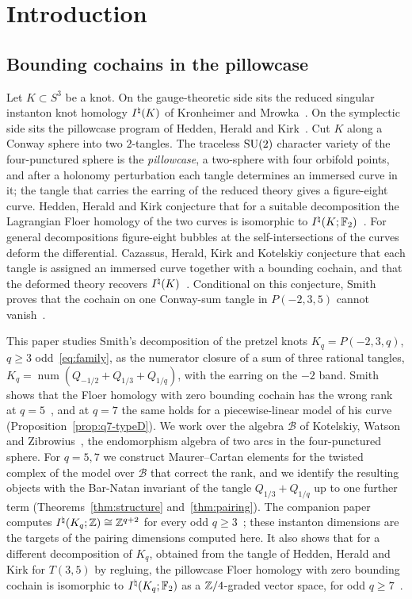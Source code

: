 \section{Introduction}\label{sec:intro}

\subsection{Bounding cochains in the pillowcase}
Let $K\subset S^3$ be a knot. On the gauge-theoretic side sits the reduced singular instanton knot
homology $I^{\natural}(K)$ of Kronheimer and Mrowka~\cite{KM1,KM2}. On the symplectic side sits the pillowcase
program of Hedden, Herald and Kirk~\cite{HHK1,HHK2}. Cut $K$ along a Conway sphere into two $2$-tangles.
The traceless $\mathrm{SU}(2)$ character variety of the four-punctured sphere is the \emph{pillowcase}, a two-sphere
with four orbifold points, and after a holonomy perturbation each tangle determines an immersed curve in
it; the tangle that carries the earring of the reduced theory gives a figure-eight curve. Hedden, Herald
and Kirk conjecture that for a suitable decomposition the Lagrangian Floer homology of the two curves is
isomorphic to $I^{\natural}(K;\mathbb{F}_2)$~\cite[Conj.~6.5]{HHK2}. For general decompositions figure-eight bubbles at
the self-intersections of the curves deform the differential. Cazassus, Herald, Kirk and Kotelskiy
conjecture that each tangle is assigned an immersed curve together with a bounding cochain, and that the
deformed theory recovers $I^{\natural}(K)$~\cite[Conj.~D]{CHKK}. Conditional on this conjecture, Smith proves that
the cochain on one Conway-sum tangle in $P(-2,3,5)$ cannot vanish~\cite[proof of Thm.~5.9]{Smith}.

This paper studies Smith's decomposition of the pretzel knots $K_q=P(-2,3,q)$, $q\ge3$
odd~\eqref{eq:family}, as the numerator closure of a sum of three rational tangles,
$K_q=\operatorname{num}(Q_{-1/2}+Q_{1/3}+Q_{1/q})$, with the earring on the $-2$ band. Smith shows that
the Floer homology with zero bounding cochain has the wrong rank at
$q=5$~\cite[proof of Thm.~5.9]{Smith}, and at $q=7$ the same holds for a piecewise-linear model of his curve
(Proposition~\ref{prop:q7-typeD}). We work over the algebra $\mathcal B$ of Kotelskiy, Watson and
Zibrowius~\cite{KWZ}, the endomorphism algebra of two arcs in the four-punctured sphere. For $q=5,7$ we
construct Maurer--Cartan elements for the twisted complex of the model over $\mathcal B$ that correct the
rank, and we identify the resulting objects with the Bar-Natan invariant of the tangle $Q_{1/3}+Q_{1/q}$ up
to one further term (Theorems~\ref{thm:structure} and~\ref{thm:pairing}). The companion paper~\cite{WuebbenII} computes
$I^{\natural}(K_q;\mathbb{Z})\cong\mathbb{Z}^{q+2}$ for every odd $q\ge3$~\cite[Thm.~1.1]{WuebbenII}; these instanton dimensions
are the targets of the pairing dimensions computed here. It also shows that for a different decomposition
of $K_q$, obtained from the tangle of Hedden, Herald and Kirk for $T(3,5)$ by regluing, the pillowcase Floer
homology with zero bounding cochain is isomorphic to $I^{\natural}(K_q;\mathbb{F}_2)$ as a $\mathbb{Z}/4$-graded vector space, for
odd $q\ge7$~\cite[Thm.~1.2]{WuebbenII}.

